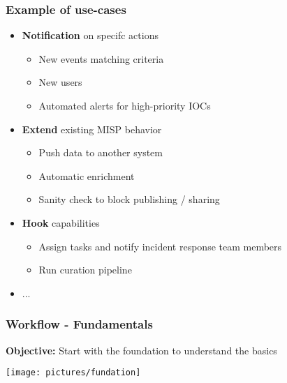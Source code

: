 \begin{frame}
    \frametitle{Example of use-cases}
    \begin{itemize}
        \item \textbf{Notification} on specifc actions
        \begin{itemize}
            \item New events matching criteria
            \item New users
            \item Automated alerts for high-priority IOCs
        \end{itemize}
        \item \textbf{Extend} existing MISP behavior
        \begin{itemize}
            \item Push data to another system
            \item Automatic enrichment
            \item Sanity check to block publishing / sharing
        \end{itemize}
        \item \textbf{Hook} capabilities
        \begin{itemize}
            \item Assign tasks and notify incident response team members
            \item Run curation pipeline
        \end{itemize}
        \item ...
    \end{itemize}
\end{frame}

\begin{frame}
    \frametitle{
        \huge
        Workflow - Fundamentals
        \vspace{1em}
    }
    \textbf{Objective:} Start with the foundation to understand the basics
    \begin{center}
        \texttt{[image: pictures/fundation]}
    \end{center}
\end{frame}


